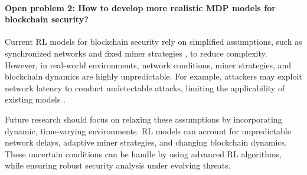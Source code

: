 

\paragraph{Open problem 2: How to develop more realistic MDP models for blockchain security?}

Current RL models for blockchain security rely on simplified assumptions, such as synchronized networks and fixed miner strategies \cite{zhang2019lay,sarenche2024deep}, to reduce complexity. However, in real-world environments, network conditions, miner strategies, and blockchain dynamics are highly unpredictable. For example, attackers may exploit network latency to conduct undetectable attacks, limiting the applicability of existing models \cite{bahrani2023undetectable}.

Future research should focus on relaxing these assumptions by incorporating dynamic, time-varying environments. RL models can account for unpredictable network delays, adaptive miner strategies, and changing blockchain dynamics. 
These uncertain conditions can be handle by using advanced RL algorithms, while ensuring robust security analysis under evolving threats.

